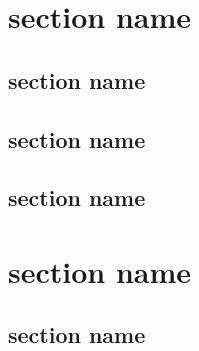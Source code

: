 \documentclass{beamer}
\begin{document}
\section{section name}
\subsection{section name}
\begin{frame}
\end{frame}

\begin{frame}
\end{frame}

\subsection{section name}
\begin{frame}
\end{frame}

\subsection{section name}
\begin{frame}
\end{frame}

\section{section name}
\subsection{section name}
\begin{frame}
\end{frame}

\begin{frame}
\end{frame}
\end{document}
